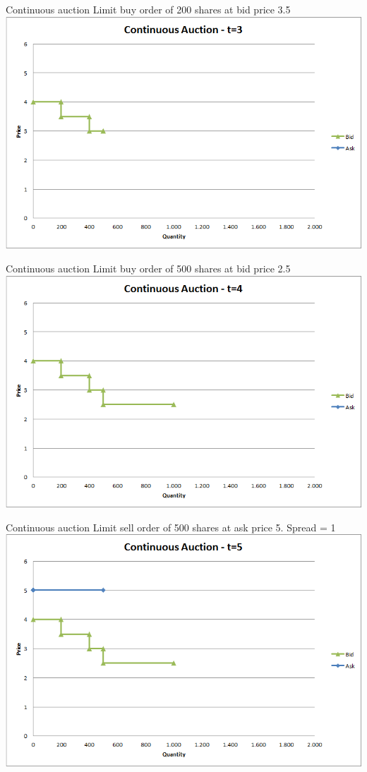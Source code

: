 \begin{frame}{Continuous auction}
	Limit buy order of 200 shares at bid price 3.5
	\quad
	\center
	\includegraphics[width=.75\linewidth]{pics/Continuous_t3}
\end{frame}


\begin{frame}{Continuous auction}
	Limit buy order of 500 shares at bid price 2.5
	\quad
	\center
	\includegraphics[width=.75\linewidth]{pics/Continuous_t4}
\end{frame}


\begin{frame}{Continuous auction}
	Limit sell order of 500 shares at ask price 5. Spread =  1
	\quad
	\center
	\includegraphics[width=.75\linewidth]{pics/Continuous_t5}
\end{frame}


